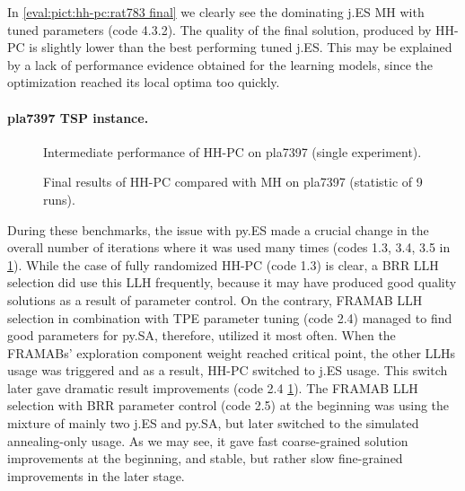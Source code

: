 In \cref{eval:pict:hh-pc:rat783 final} we clearly see the dominating j.ES MH with tuned parameters (code 4.3.2). The quality of the final solution, produced by HH-PC is slightly lower than the best performing tuned j.ES. This may be explained by a lack of performance evidence obtained for the learning models, since the optimization reached its local optima too quickly.


\paragraph{pla7397 TSP instance.}
\begin{figure}[t]
	\centering
	\vspace{-10pt}
	
	\caption{Intermediate performance of HH-PC on pla7397 (single experiment).}
	\vspace{-5pt}
	\label{eval:pict:hh-pc:pla7397 intermediate}
\end{figure}

\begin{figure}[b]
	\centering
	\vspace{-5pt}
	
	\caption{Final results of HH-PC compared with MH on pla7397 (statistic of 9 runs).}
	\vspace{-5pt}
	\label{eval:pict:hh-pc:pla7397 final}
\end{figure}

During these benchmarks, the issue with py.ES made a crucial change in the overall number of iterations where it was used many times (codes 1.3, 3.4, 3.5 in \cref{eval:pict:hh-pc:pla7397 intermediate}). While the case of fully randomized HH-PC (code 1.3) is clear, a BRR LLH selection did use this LLH frequently, because it may have produced good quality solutions as a result of parameter control. On the contrary, FRAMAB LLH selection in combination with TPE parameter tuning (code 2.4) managed to find good parameters for py.SA, therefore, utilized it most often. When the FRAMABs' exploration component weight reached critical point, the other LLHs usage was triggered and as a result, HH-PC switched to j.ES usage. This switch later gave dramatic result improvements (code 2.4 \cref{eval:pict:hh-pc:pla7397 intermediate}). The FRAMAB LLH selection with BRR parameter control (code 2.5) at the beginning was using the mixture of mainly two j.ES and py.SA, but later switched to the simulated annealing-only usage. As we may see, it gave fast coarse-grained solution improvements at the beginning, and stable, but rather slow fine-grained improvements in the later stage.

